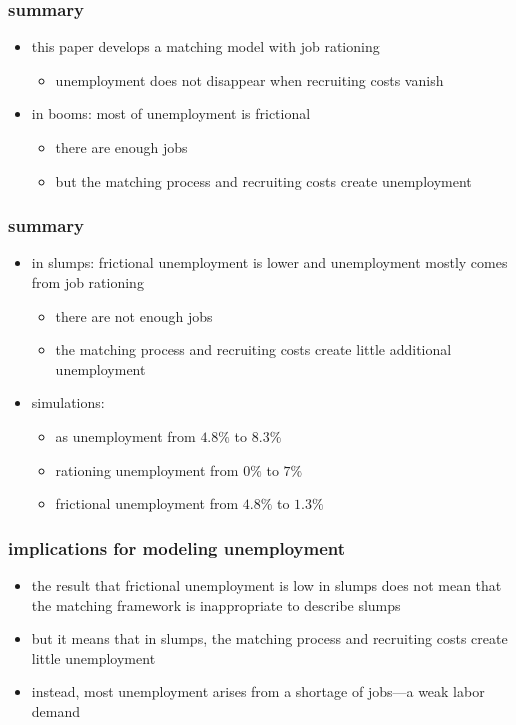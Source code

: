 \documentclass[12pt,xcolor={dvipsnames},hyperref={pdftex,pdfpagemode=UseNone,hidelinks,pdfdisplaydoctitle=true},usepdftitle=false]{beamer}
\begin{document}
\begin{frame}
\end{frame}

\begin{frame}
\frametitle{summary}
\begin{itemize}
\item this paper develops a matching model with job rationing
\begin{itemize}
\item unemployment does not disappear when recruiting costs vanish
\end{itemize}
\item in booms: most of unemployment is frictional
\begin{itemize}
\item there are enough jobs
\item but the matching process and recruiting costs create unemployment
\end{itemize}
\end{itemize}
\end{frame}

\begin{frame}
\frametitle{summary}
\begin{itemize}
\item in slumps: frictional unemployment is lower and unemployment mostly comes from job rationing
\begin{itemize}
\item there are not enough jobs
\item the matching process and recruiting costs create little additional unemployment
\end{itemize}
\item simulations: 
\begin{itemize}
\item as unemployment \up from $4.8\%$ to $8.3\%$
\item rationing unemployment \up from $0\%$ to $7\%$
\item frictional unemployment \down from $4.8\%$ to $1.3\%$ 
\end{itemize}
\end{itemize}
\end{frame}

\begin{frame}
\frametitle{implications for modeling unemployment}
\begin{itemize}
\item the result that frictional unemployment is low in slumps does not mean that the matching framework is inappropriate to describe slumps
\item but it means that in slumps, the matching process and recruiting costs create little unemployment 
\item instead, most unemployment arises from a shortage of jobs---a weak labor demand
\end{itemize}
\end{frame}
\end{document}

